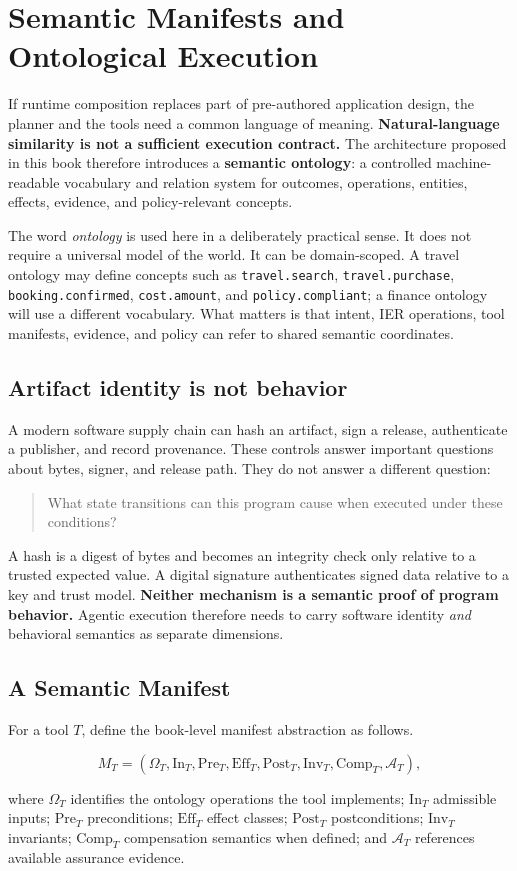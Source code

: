\documentclass[10pt,oneside,openany]{book}
\newcommand{\term}[1]{\textbf{#1}}
\newcommand{\mono}[1]{\texttt{#1}}
\begin{document}
\chapter{Semantic Manifests and Ontological Execution}

If runtime composition replaces part of pre-authored application design, the planner and the tools need a common language of meaning. \textbf{Natural-language similarity is not a sufficient execution contract.} The architecture proposed in this book therefore introduces a \term{semantic ontology}: a controlled machine-readable vocabulary and relation system for outcomes, operations, entities, effects, evidence, and policy-relevant concepts.

The word \emph{ontology} is used here in a deliberately practical sense. It does not require a universal model of the world. It can be domain-scoped. A travel ontology may define concepts such as \mono{travel.search}, \mono{travel.purchase}, \mono{booking.confirmed}, \mono{cost.amount}, and \mono{policy.compliant}; a finance ontology will use a different vocabulary. What matters is that intent, IER operations, tool manifests, evidence, and policy can refer to shared semantic coordinates.

\section{Artifact identity is not behavior}
A modern software supply chain can hash an artifact, sign a release, authenticate a publisher, and record provenance. These controls answer important questions about bytes, signer, and release path. They do not answer a different question:

\begin{quote}
What state transitions can this program cause when executed under these conditions?
\end{quote}

A hash is a digest of bytes and becomes an integrity check only relative to a trusted expected value. A digital signature authenticates signed data relative to a key and trust model. \textbf{Neither mechanism is a semantic proof of program behavior.} Agentic execution therefore needs to carry software identity \emph{and} behavioral semantics as separate dimensions.

\section{A Semantic Manifest}
For a tool $T$, define the book-level manifest abstraction as follows.
\begin{formulabox}
\[
M_T=(\Omega_T,\mathrm{In}_T,\mathrm{Pre}_T,\mathrm{Eff}_T,\mathrm{Post}_T,\mathrm{Inv}_T,\mathrm{Comp}_T,\mathcal{A}_T),
\]
\end{formulabox}
where $\Omega_T$ identifies the ontology operations the tool implements; $\mathrm{In}_T$ admissible inputs; $\mathrm{Pre}_T$ preconditions; $\mathrm{Eff}_T$ effect classes; $\mathrm{Post}_T$ postconditions; $\mathrm{Inv}_T$ invariants; $\mathrm{Comp}_T$ compensation semantics when defined; and $\mathcal{A}_T$ references available assurance evidence.
\end{document}
